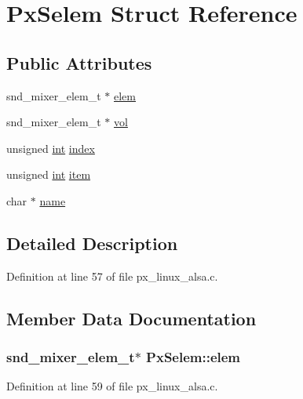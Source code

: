 \hypertarget{struct_px_selem}{}\section{Px\+Selem Struct Reference}
\label{struct_px_selem}
\subsection*{Public Attributes}
\begin{DoxyCompactItemize}
\item 
snd\+\_\+mixer\+\_\+elem\+\_\+t $\ast$ \hyperlink{struct_px_selem_a94d13dc8784d44f287253d3965af8411}{elem}
\item 
snd\+\_\+mixer\+\_\+elem\+\_\+t $\ast$ \hyperlink{struct_px_selem_aaa664a3d83e0785c233e8a74756995c0}{vol}
\item 
unsigned \hyperlink{xmltok_8h_a5a0d4a5641ce434f1d23533f2b2e6653}{int} \hyperlink{struct_px_selem_aa7ce2e1cf77ca2d456c6a53d36acd4bd}{index}
\item 
unsigned \hyperlink{xmltok_8h_a5a0d4a5641ce434f1d23533f2b2e6653}{int} \hyperlink{struct_px_selem_a0df29cae2f100b17311e53be237a4b58}{item}
\item 
char $\ast$ \hyperlink{struct_px_selem_a201584990e20d587b7758e3056cb3613}{name}
\end{DoxyCompactItemize}


\subsection{Detailed Description}


Definition at line 57 of file px\+\_\+linux\+\_\+alsa.\+c.



\subsection{Member Data Documentation}
\subsubsection[{\texorpdfstring{elem}{elem}}]{\setlength{\rightskip}{0pt plus 5cm}snd\+\_\+mixer\+\_\+elem\+\_\+t$\ast$ Px\+Selem\+::elem}\hypertarget{struct_px_selem_a94d13dc8784d44f287253d3965af8411}{}\label{struct_px_selem_a94d13dc8784d44f287253d3965af8411}


Definition at line 59 of file px\+\_\+linux\+\_\+alsa.\+c.

